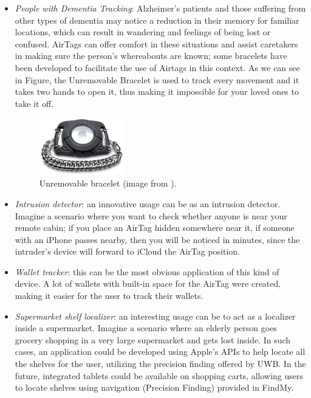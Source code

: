 \documentclass[english]{article}
\begin{document}
\begin{itemize}
  \item \textit{People with Dementia Tracking}: Alzheimer's patients and those suffering from other types of dementia may notice a reduction in their memory for familiar locations, which can result in wandering and feelings of being lost or confused. AirTags can offer comfort in these situations and assist caretakers in making sure the person's whereabouts are known; some bracelets have been developed to facilitate the use of Airtags in this context. As we can see in Figure, the Unremovable Bracelet is used to track every movement and it takes two hands to open it, thus making it impossible for your loved ones to take it off.
  \begin{figure}[]
    \centering
    \includegraphics[width=0.35\textwidth]{images/AirT-Blk-Sm.jpg}
    \caption{Unremovable bracelet (image from \cite{bracelets}).}
    \label{img:controller}
  \end{figure}
  \item \textit{Intrusion detector}: an innovative usage can be as an intrusion detector. Imagine a scenario where you want to check whether anyone is near your remote cabin; if you place an AirTag hidden somewhere near it, if someone with an iPhone passes nearby, then you will be noticed in minutes, since the intruder's device will forward to iCloud the AirTag position.
  \item \textit{Wallet tracker}: this can be the most obvious application of this kind of device. A lot of wallets with built-in space for the AirTag were created, making it easier for the user to track their wallets.
  \item \textit{Supermarket shelf localizer}: an interesting usage can be to act as a localizer inside a supermarket. Imagine a scenario where an elderly person goes grocery shopping in a very large supermarket and gets lost inside. In such cases, an application could be developed using Apple's APIs to help locate all the shelves for the user, utilizing the precision finding offered by UWB. In the future, integrated tablets could be available on shopping carts, allowing users to locate shelves using navigation (Precision Finding) provided in FindMy.
\end{itemize}
\end{document}
